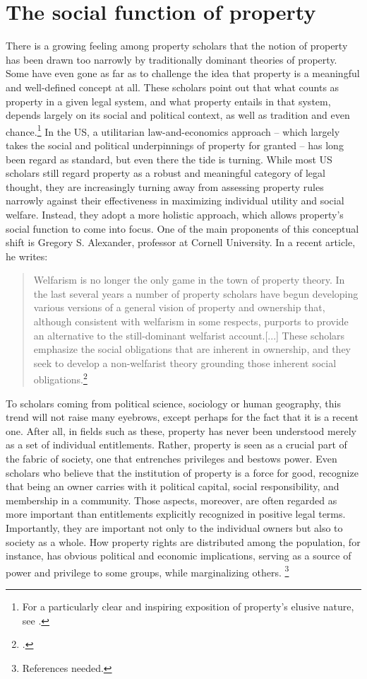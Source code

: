 \section{The social function of property}

There is a growing feeling among property scholars that the notion of property has been drawn too narrowly by traditionally dominant theories of property. Some have even gone as far as to challenge the idea that property is a meaningful and well-defined concept at all. These scholars point out that what counts as property in a given legal system, and what property entails in that system, depends largely on its social and political context, as well as tradition and even chance.\footnote{For a particularly clear and inspiring exposition of property's elusive nature, see \cite{gray91}.} In the US, a utilitarian law-and-economics approach -- which largely takes the social and political underpinnings of property for granted -- has long been regard as standard, but even there the tide is turning. While most US scholars still regard property as a robust and meaningful category of legal thought, they are increasingly turning away from assessing property rules narrowly against their effectiveness in maximizing individual utility and social welfare. Instead, they adopt a more holistic approach, which allows property's social function to come into focus. One of the main proponents of this conceptual shift  is Gregory S. Alexander, professor at Cornell University. In a recent article, he writes:

\begin{quote} Welfarism is no longer the only game in the town of property theory. In the last several years a number of property scholars have begun developing various versions of a general vision of property and ownership that, although consistent with welfarism in some respects, purports to provide an alternative to the still-dominant welfarist account.[...] These scholars emphasize the social obligations that are inherent in ownership, and they seek to develop a non-welfarist theory grounding those inherent social obligations.\footcite[1017]{alexander11}
\end{quote}

To scholars coming from political science, sociology or human geography, this trend will not raise many eyebrows, except perhaps for the fact that it is a recent one. After all, in fields such as these, property has never been understood merely as a set of individual entitlements. Rather, property is seen as a crucial part of the fabric of society, one that entrenches privileges and bestows power. Even scholars who believe that the institution of property is a force for good, recognize that being an owner carries with it political capital, social responsibility, and membership in a community. Those aspects, moreover, are often regarded as more important than entitlements explicitly recognized in positive legal terms. Importantly, they are important not only to the individual owners but also to society as a whole. How property rights are distributed among the population, for instance, has obvious political and economic implications, serving as a source of power and privilege to some groups, while marginalizing others. \footnote{References needed.}

